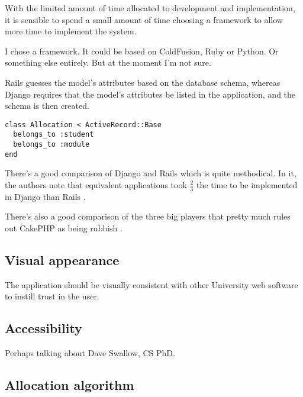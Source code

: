 \documentclass[]{article}
\begin{document}
With the limited amount of time allocated to development and implementation, it is sensible to spend a small amount of time choosing a framework to allow more time to implement the system.


I chose a framework. It could be based on ColdFusion, Ruby or Python. Or something else entirely. But at the moment I'm not sure.

Rails guesses the model's attributes based on the database schema, whereas Django requires that the model's attributes be listed in the application, and the schema is then created.

\begin{lstlisting}
class Allocation < ActiveRecord::Base
  belongs_to :student
  belongs_to :module
end
\end{lstlisting}

There's a good comparison of Django and Rails which is quite methodical. In it, the authors note that equivalent applications took $\frac{2}{3}$ the time to be implemented in Django than Rails \cite{RailsDjangoComparison_2007}.

There's also a good comparison of the three big players that pretty much rules out CakePHP as being rubbish \cite{EvalWebDevFrameworks_2009}.

\subsection{Visual appearance}

The application should be visually consistent with other University web software to instill trust in the user.


\subsection{Accessibility}

Perhaps talking about Dave Swallow, CS PhD.

\subsection{Allocation algorithm}
\end{document}
